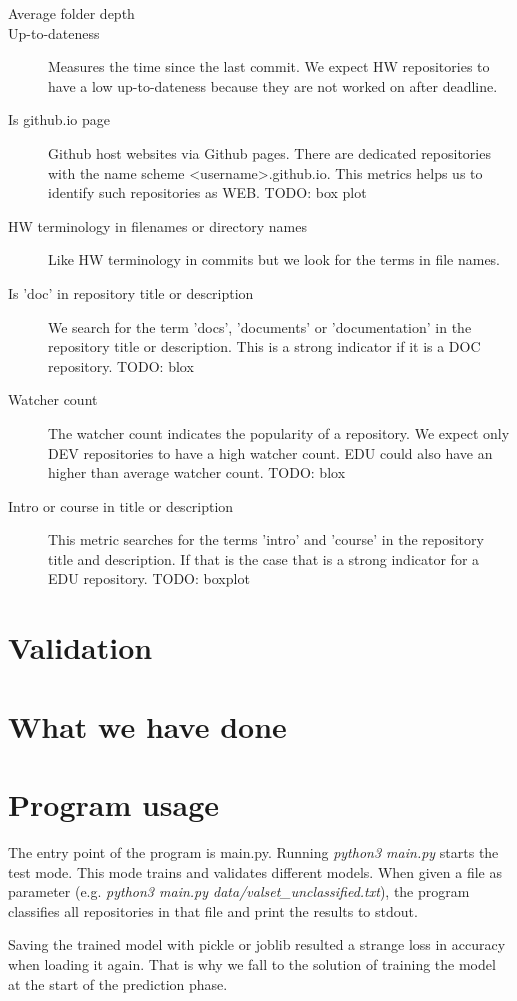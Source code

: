 \documentclass[a4paper]{scrartcl}
\begin{document}
\begin{description}
	\item[Average folder depth]
	\item[Up-to-dateness]
	Measures the time since the last commit. We expect HW repositories to have a low up-to-dateness because they are not worked on after deadline.
	\item[Is github.io page]
	Github host websites via Github pages. There are dedicated repositories with the name scheme <username>.github.io. This metrics helps us to identify such repositories as WEB.
	TODO: box plot
	\item[HW terminology in filenames or directory names]
	Like HW terminology in commits but we look for the terms in file names.
	
	\item[Is 'doc' in repository title or description]
	We search for the term 'docs', 'documents' or 'documentation' in the repository title or description. This is a strong indicator if it is a DOC repository.
	TODO: blox
	\item[Watcher count]
	The watcher count indicates the popularity of a repository. We expect only DEV repositories to have a high watcher count. EDU could also have an higher than average watcher count.
	TODO: blox
	\item[Intro or course in title or description]
	This metric searches for the terms 'intro' and 'course' in the repository title and description. If that is the case that is a strong indicator for a EDU repository.
	TODO: boxplot
	
\end{description}
	

\section{Validation}


\section{What we have done}


\section{Program usage}
The entry point of the program is main.py. Running \textit{python3 main.py} starts the test mode. This mode trains and validates different models. When given a file as parameter (e.g. \textit{python3 main.py data/valset\_unclassified.txt}), the program classifies all repositories in that file and print the results to stdout.

Saving the trained model with pickle or joblib resulted a strange loss in accuracy when loading it again. That is why we fall to the solution of training the model at the start of the prediction phase.
\end{document}

